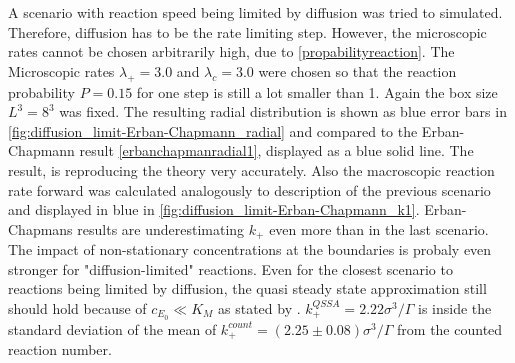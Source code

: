 \documentclass[
  a4paper,BCOR10mm,twoside,
  headsepline,footsepline,%
  fleqn,openbib
]{scrbook}
\begin{document}

A scenario with reaction speed being limited by diffusion was tried to simulated. Therefore, diffusion has to be the rate limiting step. However, the microscopic rates cannot be chosen arbitrarily high, due to \cref{propabilityreaction}. The Microscopic rates $\lambda_+=3.0$ and $\lambda_c=3.0$ were chosen so that the reaction probability $P=0.15$  for one step is still a lot smaller than 1. Again the box size $L^3=8^3$ was fixed. The resulting radial distribution is shown as blue error bars in \cref{fig:diffusion_limit-Erban-Chapmann_radial} and compared to the Erban-Chapmann result \ref{erbanchapmanradial1}, displayed as a blue solid line. The result, is reproducing the theory very accurately. Also the macroscopic reaction rate forward was calculated analogously to description of the previous scenario and displayed in blue in \cref{fig:diffusion_limit-Erban-Chapmann_k1}. Erban-Chapmans results are underestimating  $k_+$ even more than in the last scenario. The impact of non-stationary concentrations at the boundaries is probaly even stronger for "diffusion-limited" reactions. Even for the closest scenario to reactions being limited by diffusion, the quasi steady state approximation still should hold because of $ c_{E_0}\ll K_M$  as stated by \cite{Palsson1987}. $k^{QSSA}_{+}=2.22 \sigma^3/\Gamma$ is inside the standard deviation of the mean of $k^{count}_{+}=(2.25\pm0.08)\sigma^3/\Gamma$ from the counted reaction number.\par
\end{document}

